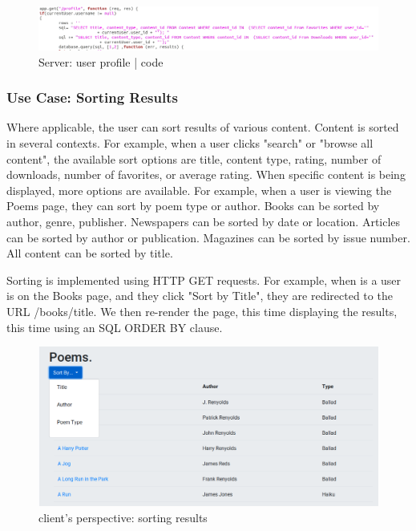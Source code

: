 \documentclass[letter, 12pt, titlepage]{article}
\begin{document}
	\begin{figure}[h!]
		\centering
		\includegraphics[scale=0.4]{profile-code.png}
		\caption{Server: user profile | code}
	\end{figure}

\newpage

	
	\subsubsection{Use Case: Sorting Results}
	Where applicable, the user can sort results of various content. Content is sorted in several contexts. For example, when a user clicks "search" or "browse all content", the available sort options are  title, content type, rating, number of downloads, number of favorites, or average rating. When specific content is being displayed, more options are available. For example, when a user is viewing the Poems page, they can sort by poem type or author. Books can be sorted by author, genre, publisher. Newspapers can be sorted by date or location. Articles can be sorted by author or publication. Magazines can be sorted by issue number. All content can be sorted by title.

	Sorting is implemented using HTTP GET requests. For example, when is a user is on the Books page, and they click "Sort by Title", they are redirected to the URL /books/title. We then re-render the page, this time displaying the results, this time using an SQL ORDER BY clause.

\begin{figure}[h!]
		\centering
		\includegraphics[scale=0.33]{sort.png}
		\caption{client's perspective: sorting results}
	\end{figure}
\end{document}
